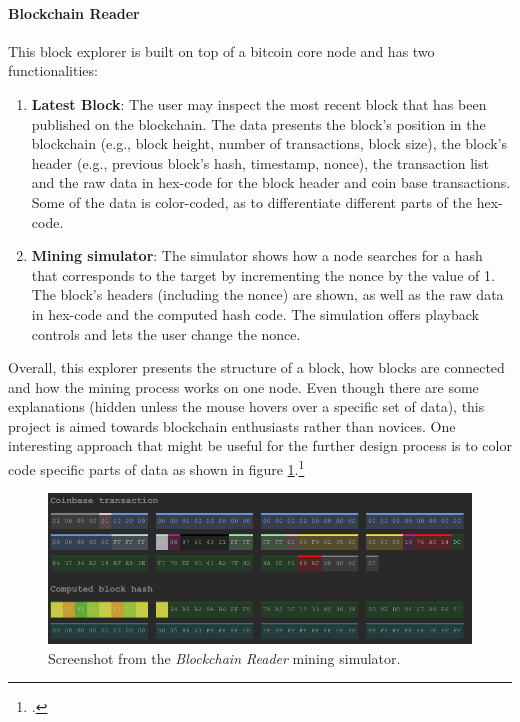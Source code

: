 \paragraph{Blockchain Reader} This block explorer is built on top of a bitcoin core node and has two functionalities:
\begin{enumerate}
    \item \textbf{Latest Block}: The user may inspect the most recent block that has been published on the blockchain. The data presents the block's position in the blockchain (e.g., block height, number of transactions, block size), the block's header (e.g., previous block's hash, timestamp, nonce), the transaction list and the raw data in hex-code for the block header and coin base transactions. Some of the data is color-coded, as to differentiate different parts of the hex-code.
    \item \textbf{Mining simulator}: The simulator shows how a node searches for a hash that corresponds to the target by incrementing the nonce by the value of 1. The block's headers (including the nonce) are shown, as well as the raw data in hex-code and the computed hash code. The simulation offers playback controls and lets the user change the nonce.
\end{enumerate}
Overall, this explorer presents the structure of a block, how blocks are connected and how the mining process works on one node. Even though there are some explanations (hidden unless the mouse hovers over a specific set of data), this project is aimed towards blockchain enthusiasts rather than novices. One interesting approach that might be useful for the further design process is to color code specific parts of data as shown in figure \ref{fig:BlockchainReader}.\footcite[Cf.][]{JornCYoghBlockchainReader2017}

\begin{figure}
    \centering
    \includegraphics[width=\linewidth]{latex-vorlage_v1.5/graphics/Bildschirmfo.png}
    \caption[Screenshot from the \textit{Blockchain Reader} mining simulator.]{Screenshot from the \textit{Blockchain Reader} mining simulator.\protect\footnotemark}
    \label{fig:BlockchainReader}
\end{figure}

